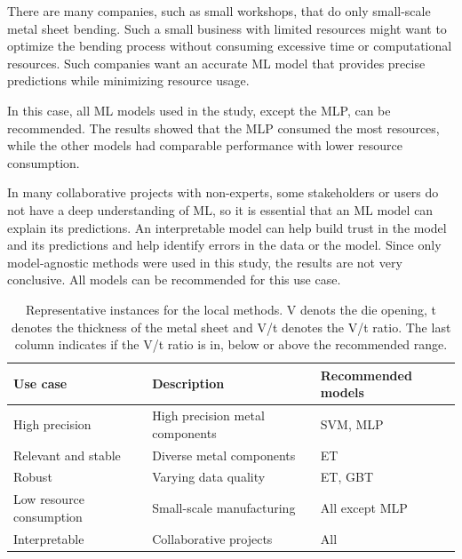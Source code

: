 There are many companies, such as small workshops, that do only small-scale metal sheet bending.
Such a small business with limited resources might want to optimize the bending process without consuming excessive
time or computational resources.
Such companies want an accurate \ac{ML} model that provides precise predictions while minimizing resource usage.

In this case, all \ac{ML} models used in the study, except the \ac{MLP}, can be recommended.
The results showed that the \ac{MLP} consumed the most resources, while the other models had comparable performance
with lower resource
consumption.

In many collaborative projects with non-experts, some stakeholders or users do not have a deep understanding of ML,
so it is essential that an ML model can explain its predictions.
An interpretable model can help build trust in the
model and its predictions and help identify errors in the data or the model.
Since only model-agnostic methods were
used in this study, the results are not very conclusive.
All models can be recommended for this use case.


\begin{table}[h]
    \begin{tcolorbox}[arc=0pt,boxrule=0.5pt]
        \centering
        \begin{tabular}{lll}
            \toprule
            \textbf{Use case} & \textbf{Description} & \textbf{Recommended models} \\
            \midrule
            High precision & High precision metal components & SVM, MLP \\
            Relevant and stable & Diverse metal components & ET \\
            Robust & Varying data quality & ET, GBT \\
            Low resource consumption & Small-scale manufacturing & All except MLP \\
            Interpretable & Collaborative projects & All \\
            \bottomrule
        \end{tabular}
    \end{tcolorbox}
    \caption{Representative instances for the local methods.
    V denots the die opening, t denotes the thickness of the metal sheet and V/t denotes the V/t ratio.
    The last column indicates if the V/t ratio is in, below or above the recommended range.}
    \label{tab:results-in-practise}
\end{table}




